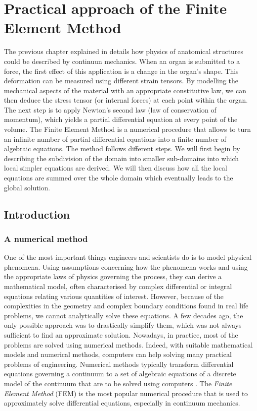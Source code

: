 \chapter{Practical approach of the Finite Element Method}
\label{chap3}
\begin{shortAbstract}
The previous chapter explained in details how physics of anatomical structures could be described by continuun mechanics. When an organ is submitted to a force, the first effect of this application is a change in the organ's shape. This deformation can be measured using different strain tensors. By modelling the mechanical aspects of the material with an appropriate constitutive law, we can then deduce the stress tensor (or internal forces) at each point within the organ. The next step is to apply Newton's second law (law of conservation of momentum), which yields a partial differential equation at every point of the volume. The Finite Element Method is a numerical procedure that allows to turn an infinite number of partial differential equations into a finite number of algebraic equations. The method follows different steps. We will first begin by describing the subdivision of the domain into smaller sub-domains into which local simpler equations are derived. We will then discuss how all the local equations are summed over the whole domain which eventually leads to the global solution. 
\end{shortAbstract}


\section{Introduction}

	\subsection{A numerical method}
One of the most important things engineers and scientists do is to model physical phenomena. Using assumptions concerning how the phenomena works and using the appropriate laws of physics governing the process, they can derive a mathematical model, often characterised by complex differential or integral equations relating various quantities of interest. However, because of the complexities in the geometry and complex boundary conditions found in real life problems, we cannot analytically solve these equations. A few decades ago, the only possible approach was to drastically simplify them, which was not always sufficient to find an approximate solution. Nowadays, in practice, most of the problems are solved using numerical methods. Indeed, with suitable mathematical models and numerical methods, computers can help solving many practical problems of engineering. Numerical methods typically transform differential equations governing a continuum to a set of algebraic equations of a discrete model of the continuum that are to be solved using computers \citep{Reddy93}. The \emph{Finite Element Method} (FEM) is the most popular numerical procedure that is used to approximately solve differential equations, especially in continuum mechanics. 
	
